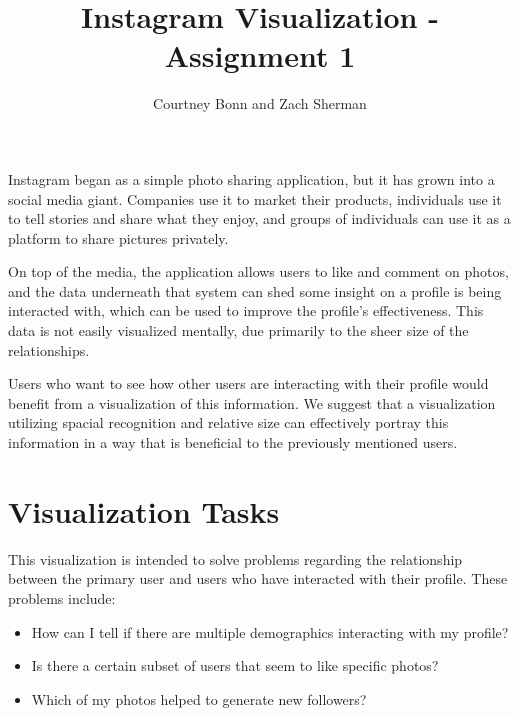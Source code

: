 \documentclass[journal]{vgtc}                %
\title{Instagram Visualization - Assignment 1}
\author{Courtney Bonn and Zach Sherman}
\begin{document}


\maketitle

Instagram began as a simple photo sharing application, but it has grown into a social media giant. Companies use it to market their products, individuals use it to tell stories and share what they enjoy, and groups of individuals can use it as a platform to share pictures privately. 

On top of the media, the application allows users to like and comment on photos, and the data underneath that system can shed some insight on a profile is being interacted with, which can be used to improve the profile's effectiveness. This data is not easily visualized mentally, due primarily to the sheer size of the relationships.

Users who want to see how other users are interacting with their profile would benefit from a visualization of this information. We suggest that a visualization utilizing spacial recognition and relative size can effectively portray this information in a way that is beneficial to the previously mentioned users.

\section{Visualization Tasks}

This visualization is intended to solve problems regarding the relationship between the primary user and users who have interacted with their profile. These problems include:
\begin{itemize}
\item How can I tell if there are multiple demographics interacting with my profile?
\item Is there a certain subset of users that seem to like specific photos?
\item Which of my photos helped to generate new followers?
\end{itemize}
\end{document}
